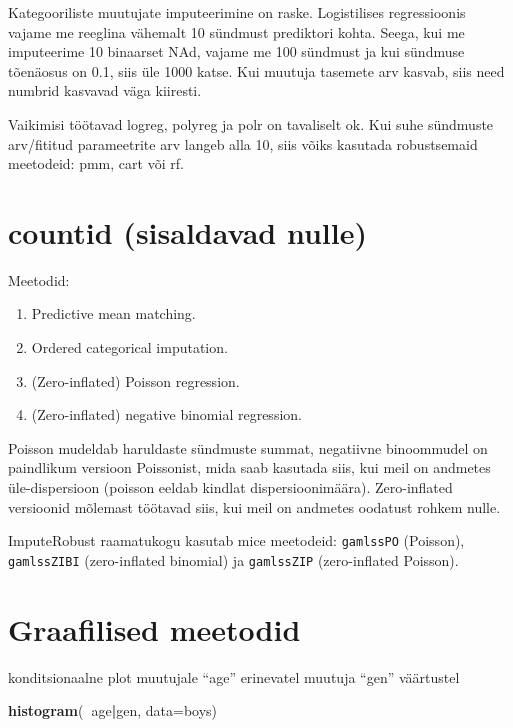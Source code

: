 \documentclass[]{book}
\newenvironment{Shaded}{\begin{snugshade}}{\end{snugshade}}
\newcommand{\KeywordTok}[1]{\textcolor[rgb]{0.13,0.29,0.53}{\textbf{#1}}}
\newcommand{\DataTypeTok}[1]{\textcolor[rgb]{0.13,0.29,0.53}{#1}}
\newcommand{\OperatorTok}[1]{\textcolor[rgb]{0.81,0.36,0.00}{\textbf{#1}}}
\newcommand{\NormalTok}[1]{#1}
\begin{document}
Kategooriliste muutujate imputeerimine on raske. Logistilises
regressioonis vajame me reeglina vähemalt 10 sündmust prediktori kohta.
Seega, kui me imputeerime 10 binaarset NAd, vajame me 100 sündmust ja
kui sündmuse tõenäosus on 0.1, siis üle 1000 katse. Kui muutuja tasemete
arv kasvab, siis need numbrid kasvavad väga kiiresti.

Vaikimisi töötavad logreg, polyreg ja polr on tavaliselt ok. Kui suhe
sündmuste arv/fititud parameetrite arv langeb alla 10, siis võiks
kasutada robustsemaid meetodeid: pmm, cart või rf.

\section{countid (sisaldavad nulle)}\label{countid-sisaldavad-nulle}

Meetodid:

\begin{enumerate}
\def\labelenumi{\arabic{enumi}.}
\item
  Predictive mean matching.
\item
  Ordered categorical imputation.
\item
  (Zero-inflated) Poisson regression.
\item
  (Zero-inflated) negative binomial regression.
\end{enumerate}

Poisson mudeldab haruldaste sündmuste summat, negatiivne binoommudel on
paindlikum versioon Poissonist, mida saab kasutada siis, kui meil on
andmetes üle-dispersioon (poisson eeldab kindlat dispersioonimäära).
Zero-inflated versioonid mõlemast töötavad siis, kui meil on andmetes
oodatust rohkem nulle.

ImputeRobust raamatukogu kasutab mice meetodeid: \texttt{gamlssPO}
(Poisson), \texttt{gamlssZIBI} (zero-inflated binomial) ja
\texttt{gamlssZIP} (zero-inflated Poisson).

\section{Graafilised meetodid}\label{graafilised-meetodid}

konditsionaalne plot muutujale ``age'' erinevatel muutuja ``gen''
väärtustel

\begin{Shaded}
\begin{Highlighting}[]
\KeywordTok{histogram}\NormalTok{(}\OperatorTok{~}\NormalTok{age}\OperatorTok{|}\NormalTok{gen, }\DataTypeTok{data=}\NormalTok{boys)}
\end{Highlighting}
\end{Shaded}
\end{document}

